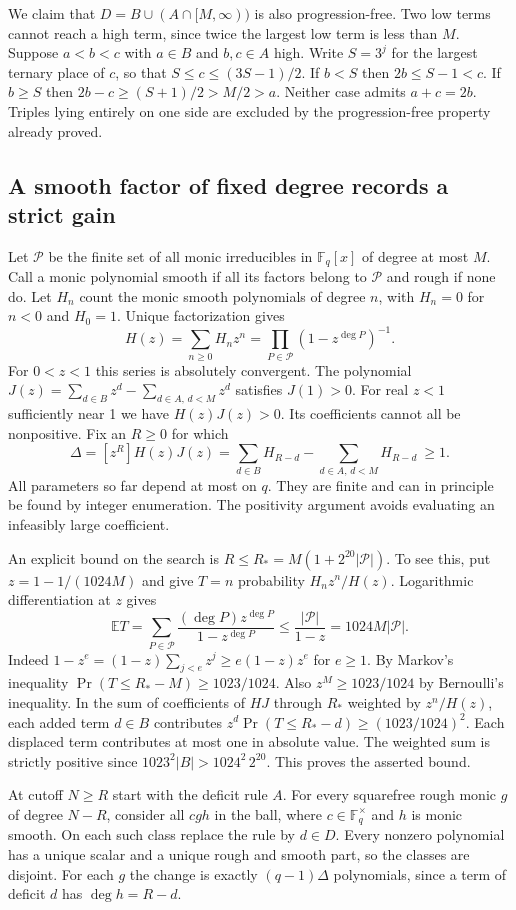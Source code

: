 We claim that $D=B\cup(A\cap[M,\infty))$ is also progression-free.
Two low terms cannot reach a high term, since twice the largest low term
is less than $M$. Suppose $a<b<c$ with $a\in B$ and $b,c\in A$ high.
Write $S=3^j$ for the largest ternary place of $c$, so that
$S\le c\le(3S-1)/2$. If $b<S$ then $2b\le S-1<c$.
If $b\ge S$ then $2b-c\ge(S+1)/2>M/2>a$.
Neither case admits $a+c=2b$. Triples lying entirely on one side
are excluded by the progression-free property already proved.

\subsection*{A smooth factor of fixed degree records a strict gain}
Let $\mathcal P$ be the finite set of all monic irreducibles in
$\mathbb F_q[x]$ of degree at most $M$. Call a monic polynomial smooth
if all its factors belong to $\mathcal P$ and rough if none do.
Let $H_n$ count the monic smooth polynomials of degree $n$, with
$H_n=0$ for $n<0$ and $H_0=1$. Unique factorization gives
\[
 H(z)=\sum_{n\ge0}H_n z^n=\prod_{P\in\mathcal P}(1-z^{\deg P})^{-1}.
\]
For $0<z<1$ this series is absolutely convergent. The polynomial
$J(z)=\sum_{d\in B}z^d-\sum_{d\in A,\,d<M}z^d$ satisfies $J(1)>0$.
For real $z<1$ sufficiently near 1 we have $H(z)J(z)>0$. Its coefficients
cannot all be nonpositive. Fix an $R\ge0$ for which
\[
 \Delta=[z^R]H(z)J(z)
   =\sum_{d\in B}H_{R-d}-\sum_{d\in A,\,d<M}H_{R-d}\ \ge1.
\]
All parameters so far depend at most on $q$. They are finite and can in
principle be found by integer enumeration. The positivity argument avoids
evaluating an infeasibly large coefficient.

An explicit bound on the search is
$R\le R_* = M(1+2^{20}|\mathcal P|)$. To see this, put
$z=1-1/(1024M)$ and give $T=n$ probability $H_nz^n/H(z)$.
Logarithmic differentiation at $z$ gives
\[
 \mathbb E T=\sum_{P\in\mathcal P}
 \frac{(\deg P)z^{\deg P}}{1-z^{\deg P}}
 \le \frac{|\mathcal P|}{1-z}=1024M|\mathcal P|.
\]
Indeed $1-z^e=(1-z)\sum_{j<e}z^j\ge e(1-z)z^e$ for $e\ge1$.
By Markov's inequality $\Pr(T\le R_*-M)\ge1023/1024$.
Also $z^M\ge1023/1024$ by Bernoulli's inequality. In the sum of
coefficients of $H J$ through $R_*$ weighted by $z^n/H(z)$, each added
term $d\in B$ contributes $z^d\Pr(T\le R_*-d)\ge(1023/1024)^2$.
Each displaced term contributes at most one in absolute value. The
weighted sum is strictly positive since $1023^2|B|>1024^2\,2^{20}$.
This proves the asserted bound.

At cutoff $N\ge R$ start with the deficit rule $A$. For every squarefree rough
monic $g$ of degree $N-R$, consider all $cgh$ in the ball, where $c\in\mathbb F_q^\times$
and $h$ is monic smooth. On each such class replace the rule by $d\in D$.
Every nonzero polynomial has a unique scalar and a unique rough and smooth
part, so the classes are disjoint. For each $g$ the change is exactly
$(q-1)\Delta$ polynomials, since a term of deficit $d$ has $\deg h=R-d$.

